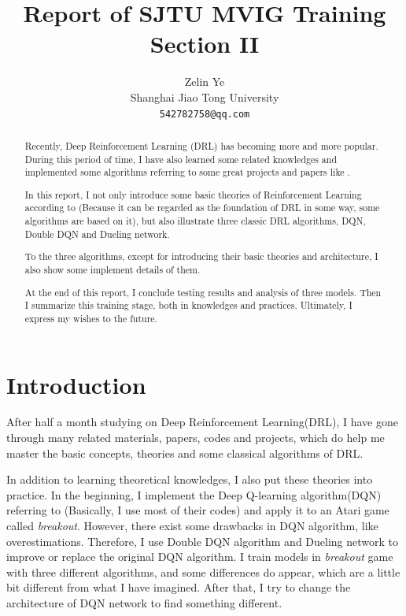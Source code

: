 \documentclass[10pt,twocolumn,letterpaper]{article}
\begin{document}
\title{
  Report of SJTU MVIG Training Section II
}
\author{
  Zelin Ye\\
  Shanghai Jiao Tong University\\
  \tt \small \  542782758@qq.com
}
\maketitle

\begin{abstract}
	Recently, Deep Reinforcement Learning (DRL) has becoming more and more popular. During this period of time, I have also learned some related knowledges and implemented some algorithms referring to some great projects and papers like \cite{DQN_nature,Double_DQN,Dueling_network}.
	
	In this report, I not only introduce some basic theories of Reinforcement Learning according to \cite{DQN_zhihu,RL_zhihu,DQN_csdn}(Because it can be regarded as the foundation of DRL in some way, some algorithms are based on it), but also illustrate three classic DRL algorithms, DQN, Double DQN and Dueling network.
	
	To the three algorithms, except for introducing their basic theories and architecture, I also show some implement details of them.
	
	At the end of this report, I conclude testing results and analysis of three models. Then I summarize this training stage, both in knowledges and practices. Ultimately, I express my wishes to the future.
\end{abstract}

\section{Introduction}

After half a month studying on Deep Reinforcement Learning(DRL), I have gone through many related materials, papers, codes and projects, which do help me master the basic concepts, theories and some classical algorithms of DRL.

In addition to learning theoretical knowledges, I also put these theories into practice. In the beginning, I implement the Deep Q-learning algorithm(DQN) referring to \cite{github_code1,github_code2}(Basically, I use most of their codes) and apply it to an Atari game called \textit{breakout}. However, there exist some drawbacks in DQN algorithm, like overestimations. Therefore, I use Double DQN algorithm and Dueling network to improve or replace the original DQN algorithm. I train models in \textit{breakout} game with three different algorithms, and some differences do appear, which are a little bit different from what I have imagined. After that, I try to change the architecture of DQN network to find something different.
\end{document}
